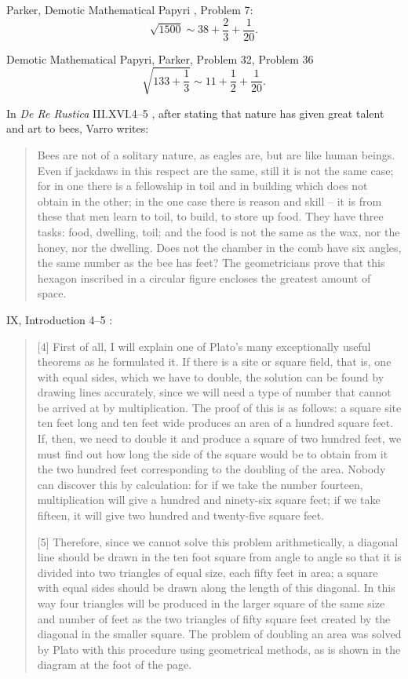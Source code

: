 Parker, Demotic Mathematical Papyri \cite{DMP}, Problem 7:
\[
\sqrt{1500} \sim 38+\frac{2}{3}+\frac{1}{20}.
\]

Demotic Mathematical Papyri, Parker, Problem 32, Problem 36
\[
\sqrt{133+\frac{1}{3}} \sim 11+\frac{1}{2}+\frac{1}{20}.
\]

In {\em De Re Rustica} III.XVI.4--5 \cite[p.~501]{varro}, after stating that nature has given great talent and art to bees, Varro writes:
 
\begin{quote}
Bees are not of a solitary nature, as eagles are, but are like human beings. Even if jackdaws in this respect are the same, still it is not the same case; for in one there is a fellowship
in toil and in building which does not obtain in the other; in the one case there is reason and skill -- it is from these that men learn to toil, to build, to store up food. They have three 
tasks: food, dwelling, toil; and the food is not the same as the wax, nor the honey, nor the dwelling. Does not the chamber in the comb have six angles, the same number as the bee 
has feet? The geometricians prove that this hexagon inscribed in a circular figure encloses the greatest amount of space.
\end{quote}

IX, Introduction 4--5 \cite[p.~243]{vitruvius}:

\begin{quote}
[4] First of all, I will explain one of Plato's many exceptionally useful theorems as he formulated it. If there is a site
or square field, that is, one with equal sides, which we have to double, the solution can be found by drawing lines accurately,
since we will need a type of number that cannot be arrived at by multiplication. The proof of this is as follows: a square site
ten feet long and ten feet wide produces an area of a hundred square feet. If, then, we need to double it and produce a square
of two hundred feet, we must find out how long the side of the square would be to obtain from it the two hundred feet corresponding
to the doubling of the area. Nobody can discover this by calculation: for if we take the number fourteen, multiplication will give a 
hundred and ninety-six square feet; if we take fifteen, it will give two hundred and twenty-five square feet.

[5] Therefore, since we cannot solve this problem arithmetically, a diagonal line should be drawn in the ten foot square
from angle to angle so that it is divided into two triangles of equal size, each fifty feet in area; a square with equal sides
should be drawn along the length of this diagonal. In this way four triangles will be produced in the larger square of the same
size and number of feet as the two triangles of fifty square feet created by the diagonal in the smaller square. The problem of
doubling an area was solved by Plato with this procedure using geometrical methods, as is shown in the diagram at the foot
of the page.
\end{quote}

